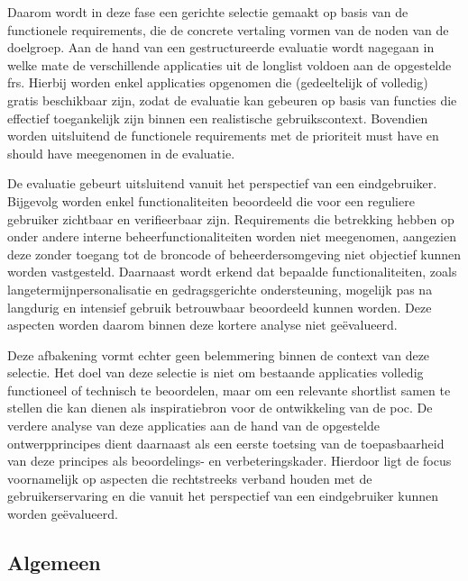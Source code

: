 \vspace{1em}

Daarom wordt in deze fase een gerichte selectie gemaakt op basis van de functionele requirements, die de concrete vertaling vormen van de noden van de doelgroep. Aan de hand van een gestructureerde evaluatie wordt nagegaan in welke mate de verschillende applicaties uit de longlist voldoen aan de opgestelde \acrlong{fr}s. Hierbij worden enkel applicaties opgenomen die (gedeeltelijk of volledig) gratis beschikbaar zijn, zodat de evaluatie kan gebeuren op basis van functies die effectief toegankelijk zijn binnen een realistische gebruikscontext. Bovendien worden uitsluitend de functionele requirements met de prioriteit must have en should have meegenomen in de evaluatie.

\vspace{1em}

De evaluatie gebeurt uitsluitend vanuit het perspectief van een eindgebruiker. Bijgevolg worden enkel functionaliteiten beoordeeld die voor een reguliere gebruiker zichtbaar en verifieerbaar zijn. Requirements die betrekking hebben op onder andere interne beheerfunctionaliteiten worden niet meegenomen, aangezien deze zonder toegang tot de broncode of beheerdersomgeving niet objectief kunnen worden vastgesteld. Daarnaast wordt erkend dat bepaalde functionaliteiten, zoals langetermijnpersonalisatie en gedragsgerichte ondersteuning, mogelijk pas na langdurig en intensief gebruik betrouwbaar beoordeeld kunnen worden. Deze aspecten worden daarom binnen deze kortere analyse niet geëvalueerd.

\vspace{1em}

Deze afbakening vormt echter geen belemmering binnen de context van deze selectie. Het doel van deze selectie is niet om bestaande applicaties volledig functioneel of technisch te beoordelen, maar om een relevante shortlist samen te stellen die kan dienen als inspiratiebron voor de ontwikkeling van de \acrshort{poc}. De verdere analyse van deze applicaties aan de hand van de opgestelde ontwerpprincipes dient daarnaast als een eerste toetsing van de toepasbaarheid van deze principes als beoordelings- en verbeteringskader. Hierdoor ligt de focus voornamelijk op aspecten die rechtstreeks verband houden met de gebruikerservaring en die vanuit het perspectief van een eindgebruiker kunnen worden geëvalueerd.

\newpage

\subsection{Algemeen}
\label{subsec:fr-algemeen}

